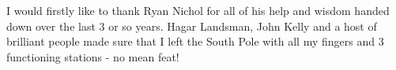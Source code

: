 I would firstly like to thank Ryan Nichol for all of his help and wisdom handed down over the last 3 or so years. Hagar Landsman, John Kelly and a host of brilliant people made sure that I left the South Pole with all my fingers and 3 functioning stations - no mean feat!

